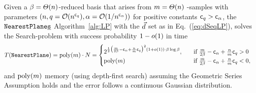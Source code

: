 \begin{thm} \label{thm:LPRunTime}
	Given a $\beta = \varTheta(n)$-\BKZ reduced basis that arises from $m = \varTheta(n)$ \LWE-samples with parameters $(n, q=\mathcal{O}(n^{\mathsf{c}_q}), \alpha = \mathcal{O}(1 / n^{\mathsf{c}_{\alpha}}) )$ for positive constants $\mathsf{c}_q >\mathsf{c}_{\alpha}$, the $\texttt{NearestPlane\underline{s}}$ Algorithm~\ref{alg:LP} with the $\vec d$ set as in Eq.~(\ref{eq:dSeqLP}), solves the Search-\LWE problem with success probability $1-o(1)$ in time
	\begin{equation*}
T(\texttt{NearestPlane})=\mathrm{poly}(m) \cdot N = \begin{cases}
                  2^{\frac{1}{2} \bigl(\frac{m}{2\beta}-\mathsf{c}_{\alpha} + \frac{n}{m} \mathsf{c}_q  \bigr)^2 (1+o(1)) \cdot \beta\log\beta},			      \quad & \text{if }  \frac{m}{2 \beta} - \mathsf{c}_{\alpha} + \frac{n}{m} \mathsf{c}_q  > 0  \\
                  \mathrm{poly}(m)                                     \quad&\text{if } \frac{m}{2 \beta} - \mathsf{c}_{\alpha} + \frac{n}{m}\mathsf{c}_q  < 0,
                  \end{cases}
	\end{equation*}
and $\mathrm{poly}(m)$ memory (using depth-first search) assuming the Geometric Series Assumption holds and the \LWE error follows a continuous Gaussian distribution.
\end{thm}

